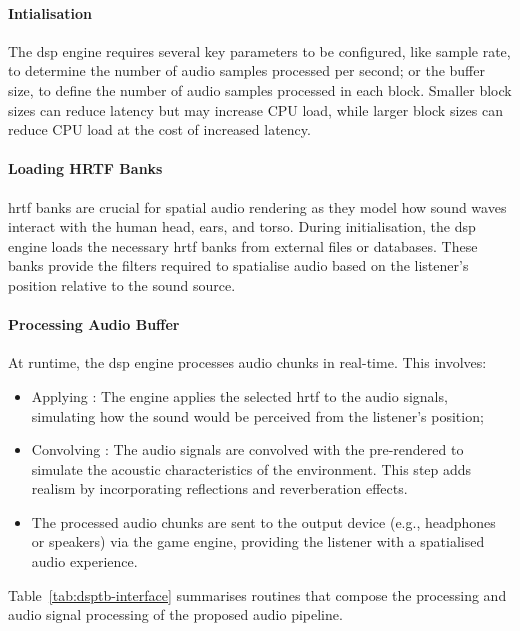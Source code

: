 \paragraph{Intialisation}
The \acrshort{dsp} engine requires several key parameters to be configured, like sample rate, to determine the number of audio samples processed per second; or the buffer size, to define the number of audio samples processed in each block. Smaller block sizes can reduce latency but may increase CPU load, while larger block sizes can reduce CPU load at the cost of increased latency.

\paragraph{Loading HRTF Banks}
\acrshort{hrtf} banks are crucial for spatial audio rendering as they model how sound waves interact with the human head, ears, and torso. During initialisation, the \acrshort{dsp} engine loads the necessary \acrshort{hrtf} banks from external files or databases. These banks provide the filters required to spatialise audio based on the listener's position relative to the sound source.

\paragraph{Processing Audio Buffer}
At runtime, the \acrshort{dsp} engine processes audio chunks in real-time. This involves:
\begin{itemize}
    \item Applying : The engine applies the selected \acrshort{hrtf} to the audio signals, simulating how the sound would be perceived from the listener's position;
    \item Convolving : The audio signals are convolved with the pre-rendered  to simulate the acoustic characteristics of the environment. This step adds realism by incorporating reflections and reverberation effects.
    \item The processed audio chunks are sent to the output device (e.g., headphones or speakers) via the game engine, providing the listener with a spatialised audio experience.
\end{itemize}

Table~\ref{tab:dsptb-interface} summarises routines that compose the processing and audio signal processing of the proposed audio pipeline.

